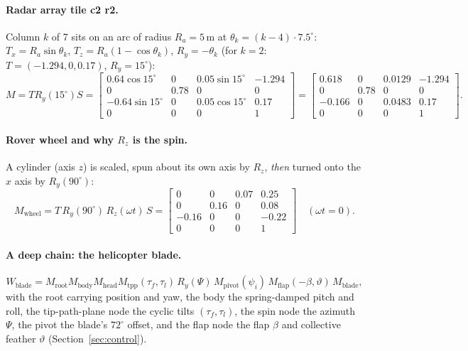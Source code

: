 \paragraph{Radar array tile c2 r2.} Column $k$ of 7 sits on an arc of radius $R_a=5$\,m at $\theta_k=(k-4)\cdot7.5^\circ$: $T_x=R_a\sin\theta_k$, $T_z=R_a(1-\cos\theta_k)$, $R_y=-\theta_k$ (for $k=2$: $T=(-1.294,0,0.17)$, $R_y=15^\circ$):
\begin{equation}
M=T R_y(15^\circ)S=\begin{bmatrix}0.64\cos15^\circ&0&0.05\sin15^\circ&-1.294\\0&0.78&0&0\\-0.64\sin15^\circ&0&0.05\cos15^\circ&0.17\\0&0&0&1\end{bmatrix}
=\begin{bmatrix}0.618&0&0.0129&-1.294\\0&0.78&0&0\\-0.166&0&0.0483&0.17\\0&0&0&1\end{bmatrix}.
\end{equation}

\paragraph{Rover wheel and why $R_z$ is the spin.} A cylinder (axis $z$) is scaled,
spun about its own axis by $R_z$, \emph{then} turned onto the $x$ axis by $R_y(90^\circ)$:
\begin{equation}
M_\text{wheel}=T\,R_y(90^\circ)\,R_z(\omega t)\,S=
\begin{bmatrix}0&0&0.07&0.25\\0&0.16&0&0.08\\-0.16&0&0&-0.22\\0&0&0&1\end{bmatrix}\quad(\omega t=0).
\end{equation}

\paragraph{A deep chain: the helicopter blade.}
\begin{equation}
W_\text{blade}=M_\text{root}M_\text{body}M_\text{head}M_\text{tpp}(\tau_f,\tau_l)\,R_y(\Psi)\,M_\text{pivot}(\psi_i)\,
M_\text{flap}(-\beta,\vartheta)\,M_\text{blade},
\end{equation}
with the root carrying position and yaw, the body the spring-damped pitch and roll, the tip-path-plane node
the cyclic tilts $(\tau_f,\tau_l)$, the spin node the azimuth $\Psi$, the pivot the blade's $72^\circ$ offset,
and the flap node the flap $\beta$ and collective feather $\vartheta$ (Section~\ref{sec:control}).

